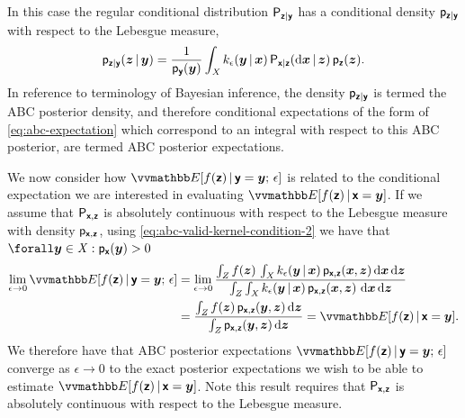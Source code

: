 In this case the regular conditional distribution $\mathsf{P}_{\boldsymbol{\mathsf{z}}|\boldsymbol{\mathsf{y}}}$ has a conditional density $\mathsf{p}_{\boldsymbol{\mathsf{z}}|\boldsymbol{\mathsf{y}}}$ with respect to the Lebesgue measure,
\begin{equation}\label{eq:abc-posterior-density}
  \mathsf{p}_{\boldsymbol{\mathsf{z}}|\boldsymbol{\mathsf{y}}}(\boldsymbol{z}\operatorname{|}\boldsymbol{y}) = 
  \frac{1}{\mathsf{p}_{\boldsymbol{\mathsf{y}}}(\boldsymbol{y})}
  \int_{\mathit{X}} k_{\epsilon}(\boldsymbol{y}\operatorname{|}\boldsymbol{x}) \,\mathsf{P}_{\boldsymbol{\mathsf{x}}|\boldsymbol{\mathsf{z}}}(\mathrm{d}\boldsymbol{x}\operatorname{|}\boldsymbol{z}) \,\mathsf{p}_{\boldsymbol{\mathsf{z}}}(\boldsymbol{z}).
\end{equation}
In reference to terminology of Bayesian inference, the density $\mathsf{p}_{\boldsymbol{\mathsf{z}}|\boldsymbol{\mathsf{y}}}$ is termed the \ac{ABC} posterior density, and therefore conditional expectations of the form of \eqref{eq:abc-expectation} which correspond to an integral with respect to this \ac{ABC} posterior, are termed \ac{ABC} posterior expectations.


We now consider how $\expc{f(\rvct{z}) \gvn \rvct{y} = \vct{y};\,\epsilon}$ is related to the conditional expectation we are interested in evaluating $\expc{f(\rvct{z}) \gvn \rvct{x}=\vct{y}}$. If we assume that $\mathsf{P}_{\boldsymbol{\mathsf{x}},\boldsymbol{\mathsf{z}}}$ is absolutely continuous with respect to the Lebesgue measure with density $\mathsf{p}_{\boldsymbol{\mathsf{x}},\boldsymbol{\mathsf{z}}}$, using \eqref{eq:abc-valid-kernel-condition-2} we have that $\forall \vct{y} \in \set{X} : \pden{\rvct{x}}(\vct{y}) > 0$
\begin{equation*}\label{eq:abc-expectation-limit}
\begin{split}
  \lim_{\epsilon \to 0}
  \expc{f(\rvct{z}) \gvn \rvct{y} = \vct{y};\,\epsilon}
  &=
  \lim_{\epsilon \to 0}
  \frac{
  \int_{\set{Z}} f(\vct{z})\, \int_{\set{X}}
    k_{\epsilon}(\vct{y}\gvn\vct{x})\,
    \pden{\rvct{x},\rvct{z}}(\vct{x},\vct{z})
  \,\dr\vct{x}\,\dr\vct{z}
  }
  {
   \int_{\set{Z}}\int_{\set{X}}
    k_\epsilon(\vct{y}\gvn\vct{x})\,\pden{\rvct{x},\rvct{z}}(\vct{x},\vct{z})\,
  \,\dr\vct{x}\,\dr\vct{z}
  }\\
  & =
  \frac{
  \int_{\set{Z}}
    f(\vct{z})\,\pden{\rvct{x},\rvct{z}}(\vct{y},\vct{z})
  \,\dr\vct{z}}
  {\int_{\set{Z}}\pden{\rvct{x},\rvct{z}}(\vct{y},\vct{z})\,\dr\vct{z}}
  =
  \expc{f(\rvct{z}) \gvn \rvct{x} = \vct{y}}.
\end{split}
\end{equation*}
We therefore have that \ac{ABC} posterior expectations $\expc{f(\rvct{z}) \gvn \rvct{y}=\vct{y};\,\epsilon}$ converge as $\epsilon \to 0$ to the exact posterior expectations we wish to be able to estimate $\expc{f(\rvct{z}) \gvn \rvct{x}=\vct{y}}$. Note this result requires that $\mathsf{P}_{\boldsymbol{\mathsf{x}},\boldsymbol{\mathsf{z}}}$ is absolutely continuous with respect to the Lebesgue measure.%

